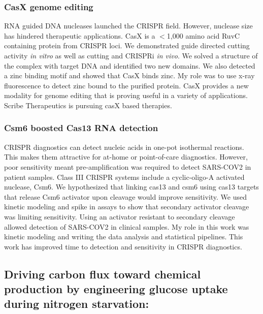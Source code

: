 \documentclass{article}
\begin{document}
\subsubsection{CasX genome editing}
RNA guided DNA nucleases launched the CRISPR field.
However, nuclease size has hindered therapeutic applications.
CasX is a $<$1,000 amino acid RuvC containing protein from CRISPR loci.
We demonstrated guide directed cutting activity \textit{in vitro} as well as cutting and CRISPRi \textit{in vivo}.
We solved a structure of the complex with target DNA and identified two new domains.
We also detected a zinc binding motif and showed that CasX binds zinc.
My role was to use x-ray fluorescence to detect zinc bound to the purified protein.
CasX provides a new modality for genome editing that is proving useful in a variety of applications.
Scribe Therapeutics is pursuing casX based therapies.
%
\subsubsection{Csm6 boosted Cas13 RNA detection}
CRISPR diagnostics can detect nucleic acids in one-pot isothermal reactions.
This makes them attractive for at-home or point-of-care diagnostics.
However, poor sensitivity meant pre-amplification was required to detect SARS-COV2 in patient samples.
Class III CRISPR systems include a cyclic-oligo-A activated nuclease, Csm6.
We hypothesized that linking cas13 and csm6 using cas13 targets that release Csm6 activator upon cleavage would improve sensitivity.
We used kinetic modeling and spike in assays to show that secondary activator cleavage was limiting sensitivity.
Using an activator resistant to secondary cleavage allowed detection of SARS-COV2 in clinical samples.
My role in this work was kinetic modeling and writing the data analysis and statistical pipelines.
This work has improved time to detection and sensitivity in CRISPR diagnostics.
%

\nocite{Liu2021-pu,Liu2019-nk}
\printbibliography[heading=none]



\newrefsection
\subsection{Driving carbon flux toward chemical production by engineering glucose uptake during nitrogen starvation:}
\end{document}
